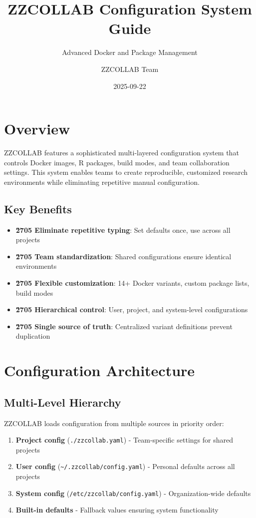 \documentclass[
]{article}
\title{ZZCOLLAB Configuration System Guide}
\subtitle{Advanced Docker and Package Management}
\author{ZZCOLLAB Team}
\date{2025-09-22}
\providecommand{\tightlist}{%
  \setlength{\itemsep}{0pt}\setlength{\parskip}{0pt}}
\begin{document}
\maketitle

\section{Overview}\label{overview}

ZZCOLLAB features a sophisticated multi-layered configuration system
that controls Docker images, R packages, build modes, and team
collaboration settings. This system enables teams to create
reproducible, customized research environments while eliminating
repetitive manual configuration.

\subsection{Key Benefits}\label{key-benefits}

\begin{itemize}
\tightlist
\item
  \textbf{\u2705 Eliminate repetitive typing}: Set defaults once, use
  across all projects
\item
  \textbf{\u2705 Team standardization}: Shared configurations ensure
  identical environments
\item
  \textbf{\u2705 Flexible customization}: 14+ Docker variants, custom
  package lists, build modes
\item
  \textbf{\u2705 Hierarchical control}: User, project, and system-level
  configurations
\item
  \textbf{\u2705 Single source of truth}: Centralized variant
  definitions prevent duplication
\end{itemize}

\section{Configuration Architecture}\label{configuration-architecture}

\subsection{Multi-Level Hierarchy}\label{multi-level-hierarchy}

ZZCOLLAB loads configuration from multiple sources in priority order:

\begin{enumerate}
\def\labelenumi{\arabic{enumi}.}
\tightlist
\item
  \textbf{Project config} (\texttt{./zzcollab.yaml}) - Team-specific
  settings for shared projects
\item
  \textbf{User config}
  (\texttt{\textasciitilde{}/.zzcollab/config.yaml}) - Personal defaults
  across all projects
\item
  \textbf{System config} (\texttt{/etc/zzcollab/config.yaml}) -
  Organization-wide defaults
\item
  \textbf{Built-in defaults} - Fallback values ensuring system
  functionality
\end{enumerate}
\end{document}
